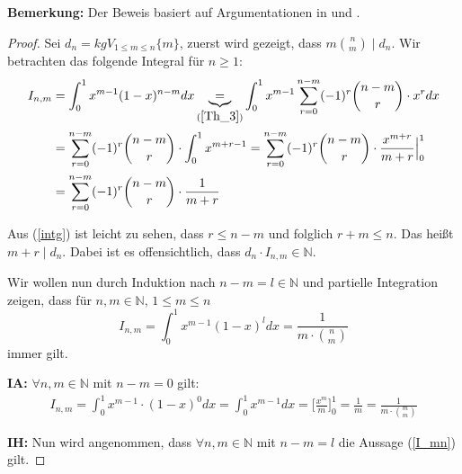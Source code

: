 \documentclass[12pt,oneside]{article}
\theoremstyle{remark}
\theoremstyle{definition}
\begin{document}
\textbf{\small{Bemerkung:}} Der Beweis basiert auf Argumentationen in \cite{aks-aachen} und \cite{nair}.
\begin{proof}
Sei $d_{n} = kgV_{1 \leq m \leq n}{\{m\}}$, zuerst wird  gezeigt, dass $m {n \choose m} \mid d_n$.\newline 
Wir betrachten das folgende Integral für $n \geq 1$:\newline
\begin{equation}\label{intg}
    \begin{split}
      \begin{aligned}
        I_{n,m}&= \int_{0}^{1} x^{m-1} (1-x)^{n - m} dx \underbrace{=}_{(\ref{Th_3})} \int_{0}^{1} x^{m-1} \sum_{r = 0}^{n - m} (-1)^r {n - m\choose r} \cdot x^r dx \\
        &= \sum_{r = 0}^{n - m}(-1)^r {n - m \choose r} \cdot \int_{0}^{1} x^{m + r - 1} 
        = \sum_{r = 0}^{n - m} (-1)^r {n - m \choose r} \cdot \frac{x^{m+r}}{m+r}\Big|_0^1\\
        &= \sum_{r = 0}^{n - m} (-1)^r {n - m \choose r} \cdot \frac{1}{m + r}
      \end{aligned}
    \end{split}
\end{equation}

Aus (\ref{intg}) ist leicht zu sehen, dass $r \leq n - m $ und folglich $ r + m \leq n $. Das heißt $m + r \mid d_{n}$. Dabei ist es offensichtlich, dass $d_{n} \cdot I_{n,m} \in \mathbb{N}$.\newline\newline

Wir wollen nun durch Induktion nach $n - m = l \in \mathbb{N}$ und partielle Integration zeigen, dass für $n,m \in \mathbb{N}, \, 1 \leq  m \leq n$
\begin{equation}\label{I_mn}
    I_{n,m} = \int_{0}^{1} x^{m-1} (1-x)^{l} dx = \frac{1}{m \cdot {n \choose m}}
\end{equation}
immer gilt.\newline\newline


\textbf{IA:}
$\forall n,m \in \mathbb{N}$ mit $ n - m = 0$ gilt:
\begin{align*}
    I_{n,m} =  \int_{0}^{1} x^{m - 1 } \cdot (1-x)^{0} dx = \int_{0}^{1} x^{m - 1} dx = \Big[ \frac{x^m}{m}\Big]_0^1 = \frac{1}{m} = \frac{1}{m \cdot {m \choose m}}
\end{align*}

\textbf{IH:}
Nun wird angenommen, dass $\forall n,m \in \mathbb{N}$ mit $ n - m  = l$ die Aussage (\ref{I_mn}) gilt.\newline\newline


\end{proof}
\end{document}
